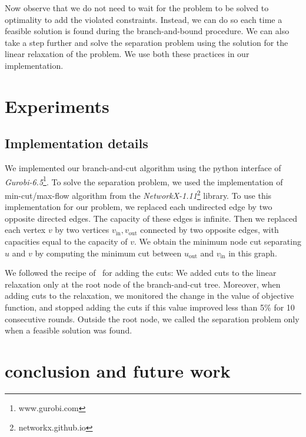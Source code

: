 \documentclass[conference,compsoc]{IEEEtran}
\begin{document}
Now observe that we do not need to wait for the problem to be solved to
optimality to add the violated constraints. Instead, we can do so each
time a feasible solution is found during the branch-and-bound procedure.
We can also take a step further and solve the separation problem using
the solution for the linear relaxation of the problem. We use both these
practices in our implementation.

\section{Experiments}
\label{sec:experiments}

\subsection{Implementation details}
We implemented our branch-and-cut algorithm using the python interface
of \emph{Gurobi-6.5}\footnote{www.gurobi.com}. To solve the separation problem, we used the
implementation of min-cut/max-flow algorithm from the \emph{NetworkX-1.11}\footnote{networkx.github.io} library. To use this implementation for our problem, we replaced
each undirected edge by two opposite directed edges. The capacity of
these edges is infinite. Then we replaced each vertex $v$ by two
vertices $v_{\text{in}}, v_{\text{out}}$ connected by two opposite
edges, with capacities equal to the capacity of $v$. We obtain the
minimum node cut separating $u$ and $v$ by computing the minimum cut
between $u_{\text{out}}$ and $v_{\text{in}}$ in this graph.

We followed the recipe of~\cite{CarvajalCGVW13} for adding the cuts: We added cuts to the
linear relaxation only at the root node of the branch-and-cut tree.
Moreover, when adding cuts to the relaxation, we monitored the change in
the value of objective function, and stopped adding the cuts if this
value improved less than 5\% for 10 consecutive rounds. Outside the root
node, we called the separation problem only when a feasible solution was
found.

\section{conclusion and future work}
\label{sec:conclusion}



\end{document}
